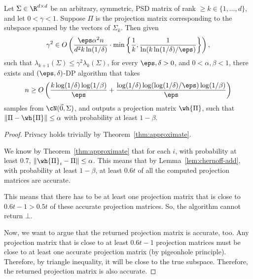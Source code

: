 \begin{theorem}\label{thm:approximate-boosted}
    Let $\Sigma \in \R^{d \times d}$ be an arbitrary, symmetric, PSD
    matrix of rank $\geq k \in \{1,\dots,d\}$, and let $0 < \gamma < 1$.
    Suppose $\Pi$ is the projection matrix corresponding
    to the subspace spanned by the vectors of $\Sigma_k$.
    Then given
    $$\gamma^2 \in
        O\left(\frac{\eps\alpha^2n}{d^{2}k\ln(1/\delta)}\cdot
        \min\left\{\frac{1}{k},
        \frac{1}{\ln(k\ln(1/\delta)/\eps)}
        \right\}\right),$$
    such that $\lambda_{k+1}(\Sigma) \leq \gamma^2\lambda_k(\Sigma)$,
    for every $\eps,\delta>0$, and $0 < \alpha,\beta < 1$,
    there exists and $(\eps,\delta)$-DP algorithm that takes
    $$n \geq O\left(\frac{k\log(1/\delta)\log(1/\beta)}{\eps} +
        \frac{\log(1/\delta)\log(\log(1/\delta)/\eps)\log(1/\beta)}{\eps}\right)$$
    samples from $\cN(\vec{0},\Sigma)$, and outputs a projection matrix $\wh{\Pi}$,
    such that $\|\Pi-\wh{\Pi}\| \leq \alpha$ with probability
    at least $1-\beta$.
\end{theorem}
\begin{proof}
    Privacy holds trivially by Theorem~\ref{thm:approximate}.

    We know by Theorem~\ref{thm:approximate} that
    for each $i$, with probability at least $0.7$,
    $\|\wh{\Pi}_i-\Pi\| \leq \alpha$. This means
    that by Lemma~\ref{lem:chernoff-add}, with probability
    at least $1-\beta$, at least $0.6t$ of all
    the computed projection matrices are accurate.

    This means that there has to be at least one projection
    matrix that is close to $0.6t-1>0.5t$ of these
    accurate projection matrices. So, the algorithm
    cannot return $\bot$.

    Now, we want to argue that the returned projection
    matrix is accurate, too. Any projection matrix
    that is close to at least $0.6t-1$ projection
    matrices must be close to at least one accurate
    projection matrix (by pigeonhole principle). Therefore,
    by triangle inequality,
    it will be close to the true subspace. Therefore,
    the returned projection matrix is also accurate.
\end{proof}



